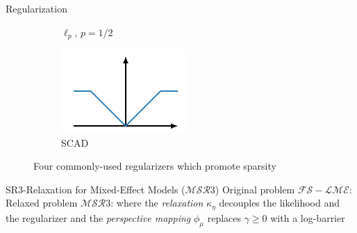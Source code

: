 \documentclass[8pt]{beamer}
\newcommand{\ouralgo}{\ensuremath{\mathcal{MSR}3}}
\begin{document}
\begin{frame}{Regularization}
\begin{figure}
\begin{subfigure}[b]{0.25\textwidth}
         \caption{$\ell_p,\, p=1/2$}
     \end{subfigure}%
     \begin{subfigure}[b]{0.25\textwidth}
         \centering
         \includegraphics[width=\textwidth]{Figures/scad_regularizer.pdf}
         \caption{SCAD}
     \end{subfigure}
     \caption{Four commonly-used regularizers which promote sparsity}
     \label{fig:three graphs}
\end{figure}

\end{frame}

\begin{frame}{SR3-Relaxation for Mixed-Effect Models ($\ouralgo$)}
Original problem $\mathcal{FS-LME}$:
Relaxed problem $\ouralgo$:
where the \textit{relaxation} $\kappa_\eta$ decouples the likelihood and the regularizer 
and the \textit{perspective mapping} $\phi_\mu$ replaces $\gamma \geq 0$ with a log-barrier 
\end{frame}
\end{document}
